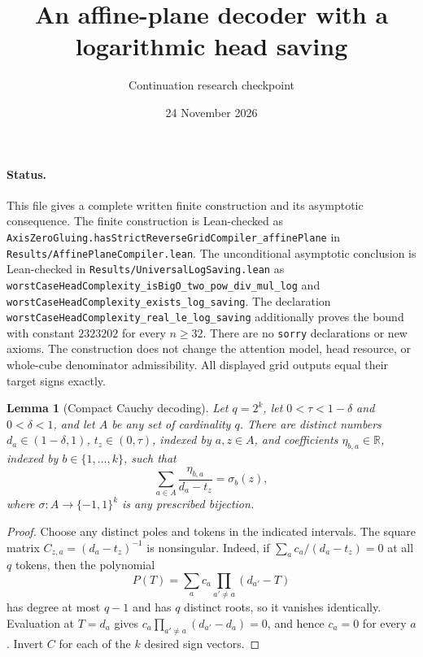 \documentclass[11pt]{article}
\newtheorem{lemma}{Lemma}
\newcommand{\R}{\mathbb R}
\begin{document}
\title{An affine-plane decoder with a logarithmic head saving}
\author{Continuation research checkpoint}
\date{24 November 2026}
\maketitle

\paragraph{Status.} This file gives a complete written finite construction and its
asymptotic consequence. The finite construction is Lean-checked as
\texttt{AxisZeroGluing.hasStrictReverseGridCompiler\_affinePlane} in
\texttt{Results/AffinePlaneCompiler.lean}. The unconditional asymptotic conclusion
is Lean-checked in \texttt{Results/UniversalLogSaving.lean} as
\texttt{worstCaseHeadComplexity\_isBigO\_two\_pow\_div\_mul\_log} and
\texttt{worstCaseHeadComplexity\_exists\_log\_saving}. The declaration
\texttt{worstCaseHeadComplexity\_real\_le\_log\_saving} additionally proves the
bound with constant $2323202$ for every $n\geq32$. There are no \texttt{sorry}
declarations or new axioms. The construction does not change the attention
model, head resource, or whole-cube denominator admissibility. All displayed
grid outputs equal their target signs exactly.

\begin{lemma}[Compact Cauchy decoding]
Let $q=2^k$, let $0<\tau<1-\delta$ and $0<\delta<1$, and let $A$ be any set
of cardinality $q$. There are distinct numbers $d_a\in(1-\delta,1)$,
$t_z\in(0,\tau)$, indexed by $a,z\in A$, and coefficients
$\eta_{b,a}\in\R$, indexed by $b\in\{1,\ldots,k\}$, such that
\[
 \sum_{a\in A}\frac{\eta_{b,a}}{d_a-t_z}=\sigma_b(z),
\]
where $\sigma:A\longrightarrow\{-1,1\}^k$ is any prescribed bijection.
\end{lemma}
\begin{proof}
Choose any distinct poles and tokens in the indicated intervals. The square
matrix $C_{z,a}=(d_a-t_z)^{-1}$ is nonsingular. Indeed, if
$\sum_a c_a/(d_a-t_z)=0$ at all $q$ tokens, then the polynomial
\[
 P(T)=\sum_a c_a\prod_{a'\ne a}(d_{a'}-T)
\]
has degree at most $q-1$ and has $q$ distinct roots, so it vanishes identically.
Evaluation at $T=d_a$ gives
$c_a\prod_{a'\ne a}(d_{a'}-d_a)=0$, and hence $c_a=0$ for every $a$.
Invert $C$ for each of the $k$ desired sign vectors.
\end{proof}
\end{document}
